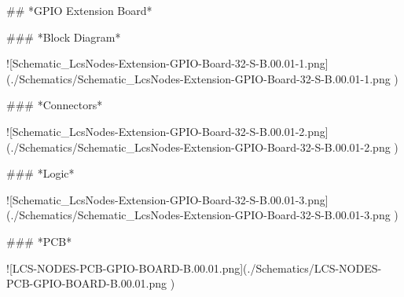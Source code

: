 ## *GPIO Extension Board*

### *Block Diagram*

![Schematic_LcsNodes-Extension-GPIO-Board-32-S-B.00.01-1.png](./Schematics/Schematic_LcsNodes-Extension-GPIO-Board-32-S-B.00.01-1.png )

### *Connectors*

![Schematic_LcsNodes-Extension-GPIO-Board-32-S-B.00.01-2.png](./Schematics/Schematic_LcsNodes-Extension-GPIO-Board-32-S-B.00.01-2.png )

### *Logic*

![Schematic_LcsNodes-Extension-GPIO-Board-32-S-B.00.01-3.png](./Schematics/Schematic_LcsNodes-Extension-GPIO-Board-32-S-B.00.01-3.png )

### *PCB*

![LCS-NODES-PCB-GPIO-BOARD-B.00.01.png](./Schematics/LCS-NODES-PCB-GPIO-BOARD-B.00.01.png )
